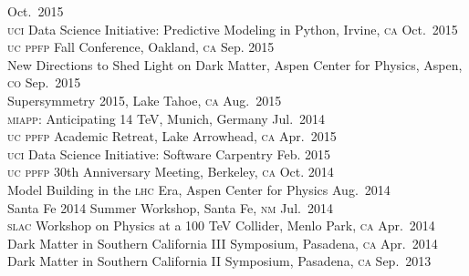 \documentclass[margin,line]{resume}
\newcommand{\scap}[1]{\textsc{\MakeLowercase{#1}}}
\begin{document}
\begin{resume}
\hfill 
Oct.~2015\vspace{.7mm}\\   
%
\scap{UCI} Data Science Initiative: Predictive Modeling in Python, Irvine, \scap{CA}
\hfill 
Oct.~2015\vspace{.7mm}\\   
%
\scap{UC PPFP} Fall Conference, Oakland, \scap{CA}
\hfill 
Sep. 2015\vspace{.7mm}\\   
%
New Directions to Shed Light on Dark Matter, Aspen Center for Physics, Aspen, \scap{CO}
\hfill Sep.~2015\vspace{.7mm}\\   
%
Supersymmetry 2015, Lake Tahoe, \scap{CA}
\hfill Aug.~2015\vspace{.7mm}\\   
%
\scap{MIAPP}: Anticipating 14 TeV, Munich, Germany
\hfill Jul.~2014\vspace{.7mm}\\   
%
\scap{UC PPFP} Academic Retreat, Lake Arrowhead, \scap{CA}
\hfill Apr.~2015\vspace{.7mm}\\   
%
\scap{UCI} Data Science Initiative: Software Carpentry
\hfill 
Feb. 2015\vspace{.7mm}\\   
%
\scap{UC PPFP} 30th Anniversary Meeting, Berkeley, \scap{CA}
\hfill 
Oct. 2014\vspace{.7mm}\\   
%
Model Building in the \scap{LHC} Era, Aspen Center for Physics
\hfill Aug.~2014\vspace{.7mm}\\   
%
Santa Fe 2014 Summer Workshop, Santa Fe, \scap{NM}
\hfill Jul.~2014\vspace{.7mm}\\   
% 
\scap{SLAC} Workshop on Physics at a 100 TeV Collider, Menlo Park, \scap{CA}
\hfill Apr.~2014\vspace{.7mm}\\   
%
Dark Matter in Southern California III Symposium, Pasadena, \scap{CA}
\hfill Apr.~2014\vspace{.7mm}\\   
%   
Dark Matter in Southern California II Symposium, Pasadena, \scap{CA}
\hfill Sep.~2013\vspace{.7mm}\\

\end{resume}
\end{document}
